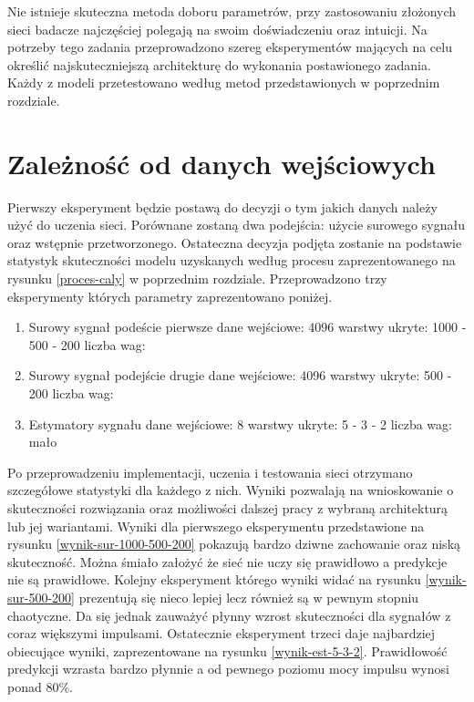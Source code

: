 \documentclass[inzynierska]{pwr_wmat_praca_dyplomowa}
\theoremstyle{plain}
\numberwithin{theorem}{chapter}
\theoremstyle{definition}
\numberwithin{theorem}{chapter}
\begin{document}
Nie istnieje skuteczna metoda doboru parametrów, przy zastosowaniu złożonych sieci badacze najczęściej polegają na swoim doświadczeniu oraz intuicji. Na potrzeby tego zadania przeprowadzono szereg eksperymentów mających na celu określić najskuteczniejszą architekturę do wykonania postawionego zadania. Każdy z modeli przetestowano według metod przedstawionych w poprzednim rozdziale. 

\section{Zależność od danych wejściowych}
Pierwszy eksperyment będzie postawą do decyzji o tym jakich danych należy użyć do uczenia sieci. Porównane zostaną dwa podejścia: użycie surowego sygnału oraz wstępnie przetworzonego. Ostateczna decyzja podjęta zostanie na podstawie statystyk skuteczności modelu uzyskanych według procesu zaprezentowanego na rysunku \ref{proces-caly} w poprzednim rozdziale. Przeprowadzono trzy eksperymenty których parametry zaprezentowano poniżej.

\begin{enumerate}
	\item Surowy sygnał podeście pierwsze
	\subitem dane wejściowe: 4096
	\subitem warstwy ukryte: 1000 - 500 - 200
	\subitem liczba wag: 
	
	\item Surowy sygnał podejście drugie
	\subitem dane wejściowe: 4096
	\subitem warstwy ukryte: 500 - 200
	\subitem liczba wag:
	
	\item Estymatory sygnału
	\subitem dane wejściowe: 8
	\subitem warstwy ukryte: 5 - 3 - 2
	\subitem liczba wag: mało
\end{enumerate}

Po przeprowadzeniu implementacji, uczenia i testowania sieci otrzymano szczegółowe statystyki dla każdego z nich. Wyniki pozwalają na wnioskowanie o skuteczności rozwiązania oraz możliwości dalszej pracy z wybraną architekturą lub jej wariantami. Wyniki dla pierwszego eksperymentu przedstawione na rysunku \ref{wynik-sur-1000-500-200} pokazują bardzo dziwne zachowanie oraz niską skuteczność. Można śmiało założyć że sieć nie uczy się prawidłowo a predykcje nie są prawidłowe. Kolejny eksperyment którego wyniki widać na rysunku \ref{wynik-sur-500-200} prezentują się nieco lepiej lecz również są w pewnym stopniu chaotyczne. Da się jednak zauważyć płynny wzrost skuteczności dla sygnałów z coraz większymi impulsami. Ostatecznie eksperyment trzeci daje najbardziej obiecujące wyniki, zaprezentowane na rysunku \ref{wynik-est-5-3-2}. Prawidłowość predykcji wzrasta bardzo płynnie a od pewnego poziomu mocy impulsu wynosi ponad $80\%$.
\end{document}
